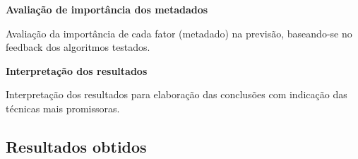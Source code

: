             \textbf{Avaliação de importância dos metadados}\par
            Avaliação da importância de cada fator (metadado) na previsão, baseando-se no feedback dos algoritmos testados.\newline
    
            \textbf{Interpretação dos resultados}\par
            Interpretação dos resultados para elaboração das conclusões com indicação das técnicas mais promissoras.\newline

        \subsection{Resultados obtidos}

